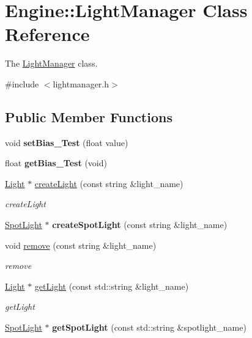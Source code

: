 \hypertarget{classEngine_1_1LightManager}{}\section{Engine\+:\+:Light\+Manager Class Reference}
\label{classEngine_1_1LightManager}


The \hyperlink{classEngine_1_1LightManager}{Light\+Manager} class.  




{\ttfamily \#include $<$lightmanager.\+h$>$}

\subsection*{Public Member Functions}
\begin{DoxyCompactItemize}
\item 
\hypertarget{classEngine_1_1LightManager_ac886d9357ad312c625066e95d3cfd14e}{}void {\bfseries set\+Bias\+\_\+\+Test} (float value)\label{classEngine_1_1LightManager_ac886d9357ad312c625066e95d3cfd14e}

\item 
\hypertarget{classEngine_1_1LightManager_a8fd0da62e739ab9d4931c008a7c16475}{}float {\bfseries get\+Bias\+\_\+\+Test} (void)\label{classEngine_1_1LightManager_a8fd0da62e739ab9d4931c008a7c16475}

\item 
\hyperlink{classEngine_1_1Light}{Light} $\ast$ \hyperlink{classEngine_1_1LightManager_a1fc44ab503b283155ca0541e033380bd}{create\+Light} (const string \&light\+\_\+name)
\begin{DoxyCompactList}\small\item\em create\+Light \end{DoxyCompactList}\item 
\hypertarget{classEngine_1_1LightManager_a3900dcd2b60f42d1028ab18b1d50fad6}{}\hyperlink{classEngine_1_1SpotLight}{Spot\+Light} $\ast$ {\bfseries create\+Spot\+Light} (const string \&light\+\_\+name)\label{classEngine_1_1LightManager_a3900dcd2b60f42d1028ab18b1d50fad6}

\item 
void \hyperlink{classEngine_1_1LightManager_a410c2c0a2b518dc89be34788bdc9d22c}{remove} (const string \&light\+\_\+name)
\begin{DoxyCompactList}\small\item\em remove \end{DoxyCompactList}\item 
\hyperlink{classEngine_1_1Light}{Light} $\ast$ \hyperlink{classEngine_1_1LightManager_ab516482393ea525e57a24b6ccfa2b32f}{get\+Light} (const std\+::string \&light\+\_\+name)
\begin{DoxyCompactList}\small\item\em get\+Light \end{DoxyCompactList}\item 
\hypertarget{classEngine_1_1LightManager_a64c342a479210b8f4211aa2880aa05c6}{}\hyperlink{classEngine_1_1SpotLight}{Spot\+Light} $\ast$ {\bfseries get\+Spot\+Light} (const std\+::string \&spotlight\+\_\+name)\label{classEngine_1_1LightManager_a64c342a479210b8f4211aa2880aa05c6}


\end{DoxyCompactItemize}
